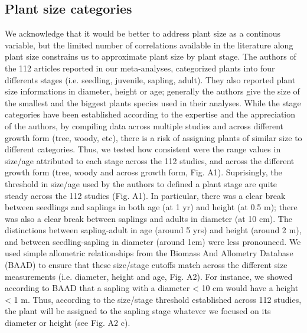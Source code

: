 \documentclass[a4paper]{article}\usepackage[]{graphicx}\usepackage[]{color}
\begin{document}
\subsection*{Plant size categories}\label{plant-size-categories}

We acknowledge that it would be better to address plant size as a continous variable, but the limited number of correlations available in the literature along plant size constrains us to approximate plant size by plant stage. The authors of the 112 articles reported in our meta-analyses, categorized plants into four differents stages (i.e. seedling, juvenile, sapling, adult). They also reported plant size informations in diameter, height or age; generally the authors give the size of the smallest and the biggest plants species used in their analyses. While the stage categories have been established according to the expertise and the appreciation of the authors, by compiling data across multiple studies and across different growth form (tree, woody, etc), there is a risk of assigning plants of similar size to different categories. Thus, we tested how consistent were the range values in size/age attributed to each stage across the 112 studies, and across the different growth form (tree, woody and across growth form, Fig. A1). Suprisingly, the threshold in size/age used by the authors to defined a plant stage are quite steady across the 112 studies (Fig. A1). In particular, there was a clear break between seedlings and saplings in both age (at 1 yr) and height (at 0.5 m); there was also a clear break between saplings and adults in diameter (at 10 cm). The distinctions between sapling-adult in age (around 5 yrs) and height (around 2 m), and between seedling-sapling in diameter (around 1cm) were less pronounced. We used simple allometric relationships from the Biomass And Allometry Database (BAAD) \citep{Falster:2015} to ensure that these size/stage cutoffs match across the different size measurements (i.e. diameter, height and age, Fig. A2). For instance, we showed according to BAAD that a sapling with a diameter < 10 cm would have a height < 1 m. Thus, according to the size/stage threshold established across 112 studies, the plant will be assigned to the sapling stage whatever we focused on its diameter or height (see Fig. A2 c).
\end{document}
